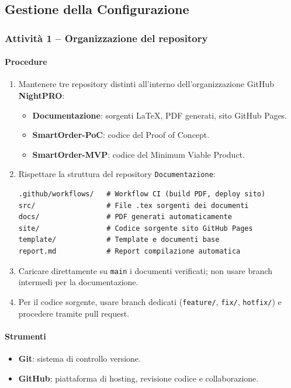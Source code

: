 \documentclass[a4paper, 11pt, oneside]{scrartcl}
\begin{document}
\subsection{Gestione della Configurazione}

\subsubsection{Attività 1 – Organizzazione del repository}

\paragraph{Procedure}
\begin{enumerate}
    \item Mantenere tre repository distinti all'interno dell'organizzazione GitHub \textbf{NightPRO}:
    \begin{itemize}
        \item \textbf{Documentazione}: sorgenti \LaTeX{}, PDF generati, sito GitHub Pages.
        \item \textbf{SmartOrder-PoC}: codice del Proof of Concept.
        \item \textbf{SmartOrder-MVP}: codice del Minimum Viable Product.
    \end{itemize}
    \item Rispettare la struttura del repository \texttt{Documentazione}:
\begin{verbatim}
.github/workflows/   # Workflow CI (build PDF, deploy sito)
src/                 # File .tex sorgenti dei documenti
docs/                # PDF generati automaticamente
site/                # Codice sorgente sito GitHub Pages
template/            # Template e documenti base
report.md            # Report compilazione automatica
\end{verbatim}
    \item Caricare direttamente su \texttt{main} i documenti verificati; non usare branch intermedi per la documentazione.
    \item Per il codice sorgente, usare branch dedicati (\texttt{feature/}, \texttt{fix/}, \texttt{hotfix/}) e procedere tramite pull request.
\end{enumerate}

\paragraph{Strumenti}
\begin{itemize}
    \item \textbf{Git}: sistema di controllo versione.
    \item \textbf{GitHub}: piattaforma di hosting, revisione codice e collaborazione.
\end{itemize}
\end{document}
